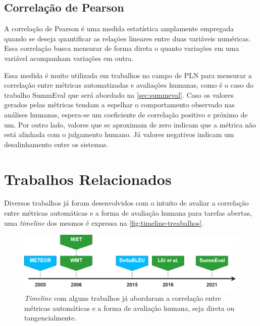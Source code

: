 \documentclass[cic,tc]{iiufrgs}
\begin{document}
\section{Correlação de Pearson}
\label{sec:pearson}
A correlação de Pearson é uma medida estatística amplamente empregada quando se deseja quantificar as relações lineares entre duas variáveis numéricas. Essa correlação busca mensurar de forma direta o quanto variações em uma variável acompanham variações em outra.

Essa medida é muito utilizada em trabalhos no campo de PLN para mensurar a correlação entre métricas automatizadas e avaliações humanas, como é o caso do trabalho SummEval \cite{fabbri2021summeval} que será abordado na \autoref{sec:summeval}. Caso os valores gerados pelas métricas tendam a espelhar o comportamento observado nas análises humanas, espera-se um coeficiente de correlação positivo e próximo de um. Por outro lado, valores que se aproximam de zero indicam que a métrica não está alinhada com o julgamento humano. Já valores negativos indicam um desalinhamento entre os sistemas. 

\chapter{Trabalhos Relacionados}

Diversos trabalhos já foram desenvolvidos com o intuito de avaliar a correlação entre métricas automáticas e a forma de avaliação humana para tarefas abertas, 
uma \textit{timeline} dos mesmos é expressa na \autoref{fig:timeline-treabalhos}. 

\label{cap:trabalhos relacionados}
\begin{figure}[htbp]
    \caption{\textit{Timeline} com alguns trabalhos já abordaram a correlação entre métricas automáticas e a forma de avaliação humana, seja direta ou tangencialmente.}
    \begin{center}
    \includegraphics[width=\textwidth]{Figures/TCC-timeline-trabalhos.png}
    \end{center}
    \label{fig:timeline-treabalhos}
\end{figure}
\end{document}
